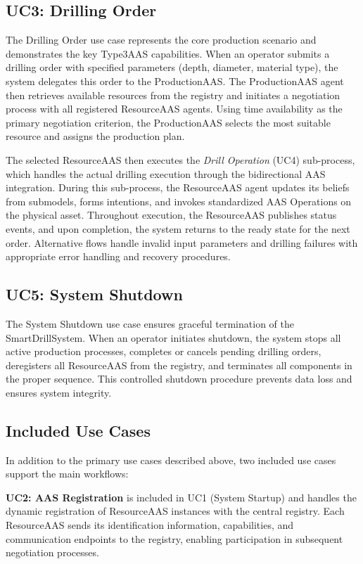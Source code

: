 \subsection{UC3: Drilling Order}

The Drilling Order use case represents the core production scenario and demonstrates the key \ac{Type3AAS} capabilities. When an operator submits a drilling order with specified parameters (depth, diameter, material type), the system delegates this order to the ProductionAAS. The ProductionAAS agent then retrieves available resources from the registry and initiates a negotiation process with all registered ResourceAAS agents. Using time availability as the primary negotiation criterion, the ProductionAAS selects the most suitable resource and assigns the production plan. 

The selected ResourceAAS then executes the \textit{Drill Operation} (UC4) sub-process, which handles the actual drilling execution through the bidirectional \ac{AAS} integration. During this sub-process, the ResourceAAS agent updates its beliefs from submodels, forms intentions, and invokes standardized \ac{AAS} Operations on the physical asset. Throughout execution, the ResourceAAS publishes status events, and upon completion, the system returns to the ready state for the next order. Alternative flows handle invalid input parameters and drilling failures with appropriate error handling and recovery procedures.

\subsection{UC5: System Shutdown}

The System Shutdown use case ensures graceful termination of the SmartDrillSystem. When an operator initiates shutdown, the system stops all active production processes, completes or cancels pending drilling orders, deregisters all ResourceAAS from the registry, and terminates all components in the proper sequence. This controlled shutdown procedure prevents data loss and ensures system integrity.

\subsection{Included Use Cases}

In addition to the primary use cases described above, two included use cases support the main workflows:

\textbf{UC2: AAS Registration} is included in UC1 (System Startup) and handles the dynamic registration of ResourceAAS instances with the central registry. Each ResourceAAS sends its identification information, capabilities, and communication endpoints to the registry, enabling participation in subsequent negotiation processes.


